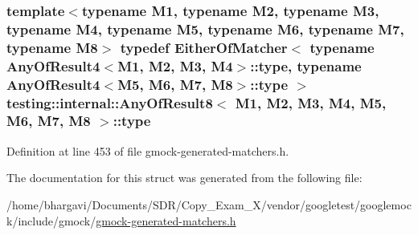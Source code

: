 \subsubsection[{\texorpdfstring{type}{type}}]{\setlength{\rightskip}{0pt plus 5cm}template$<$typename M1, typename M2, typename M3, typename M4, typename M5, typename M6, typename M7, typename M8$>$ typedef {\bf Either\+Of\+Matcher}$<$ typename {\bf Any\+Of\+Result4}$<$M1, M2, M3, M4$>$\+::{\bf type}, typename {\bf Any\+Of\+Result4}$<$M5, M6, M7, M8$>$\+::{\bf type} $>$ {\bf testing\+::internal\+::\+Any\+Of\+Result8}$<$ M1, M2, M3, M4, M5, M6, M7, M8 $>$\+::{\bf type}}\hypertarget{structtesting_1_1internal_1_1_any_of_result8_a8f8a1e78a019965c24bd22c78885747d}{}\label{structtesting_1_1internal_1_1_any_of_result8_a8f8a1e78a019965c24bd22c78885747d}


Definition at line 453 of file gmock-\/generated-\/matchers.\+h.



The documentation for this struct was generated from the following file\+:\begin{DoxyCompactItemize}
\item 
/home/bhargavi/\+Documents/\+S\+D\+R/\+Copy\+\_\+\+Exam\+\_\+X/vendor/googletest/googlemock/include/gmock/\hyperlink{gmock-generated-matchers_8h}{gmock-\/generated-\/matchers.\+h}\end{DoxyCompactItemize}
